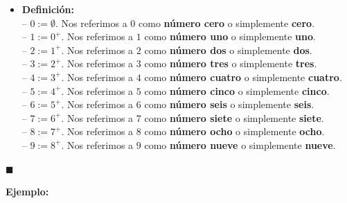 \documentclass[10 pt]{article}
\begin{document}
\begin{itemize}
    \item \Large{\textbf{Definición:} \\

    -- $0:=\emptyset$. Nos referimos a $0$ como \textbf{número cero} o simplemente \textbf{cero}. \\

    -- $1:=0^+$. Nos referimos a $1$ como \textbf{número uno} o simplemente \textbf{uno}. \\ 

    -- $2:=1^+$. Nos referimos a $2$ como \textbf{número dos} o simplemente \textbf{dos}. \\

    -- $3:=2^+$. Nos referimos a $3$ como \textbf{número tres} o simplemente \textbf{tres}.  \\

    -- $4:=3^+$. Nos referimos a $4$ como \textbf{número cuatro} o simplemente \textbf{cuatro}. \\

    -- $5:=4^+$. Nos referimos a $5$ como \textbf{número cinco} o simplemente \textbf{cinco}. \\

    -- $6:=5^+$. Nos referimos a $6$ como \textbf{número seis} o simplemente \textbf{seis}. \\

    -- $7:=6^+$. Nos referimos a $7$ como \textbf{número siete} o simplemente \textbf{siete}. \\

    -- $8:=7^+$. Nos referimos a $8$ como \textbf{número ocho} o simplemente \textbf{ocho}. \\

    -- $9:=8^+$. Nos referimos a $9$ como \textbf{número nueve} o simplemente \textbf{nueve}.} \\
\end{itemize}

\begin{flushright}
    $\blacksquare$
\end{flushright}

\Large{\textbf{Ejemplo:}} \\
\end{document}
